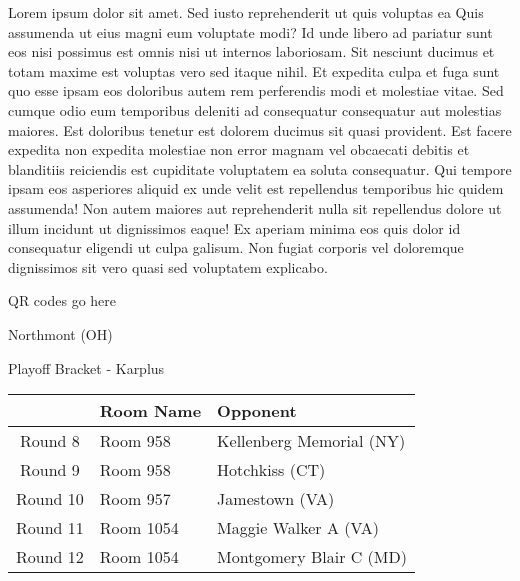\documentclass{article}%
\begin{document}
\vspace*{8pt}%
\linebreak%
\newline%
\newline%
Lorem ipsum dolor sit amet. Sed iusto reprehenderit ut quis voluptas ea Quis assumenda ut eius magni eum voluptate modi? Id unde libero ad pariatur sunt eos nisi possimus est omnis nisi ut internos laboriosam. Sit nesciunt ducimus et totam maxime est voluptas vero sed itaque nihil. Et expedita culpa et fuga sunt quo esse ipsam eos doloribus autem rem perferendis modi et molestiae vitae.\newline%
\newline%
Sed cumque odio eum temporibus deleniti ad consequatur consequatur aut molestias maiores. Est doloribus tenetur est dolorem ducimus sit quasi provident. Est facere expedita non expedita molestiae non error magnam vel obcaecati debitis et blanditiis reiciendis est cupiditate voluptatem ea soluta consequatur. Qui tempore ipsam eos asperiores aliquid ex unde velit est repellendus temporibus hic quidem assumenda!\newline%
\newline%
Non autem maiores aut reprehenderit nulla sit repellendus dolore ut illum incidunt ut dignissimos eaque! Ex aperiam minima eos quis dolor id consequatur eligendi ut culpa galisum. Non fugiat corporis vel doloremque dignissimos sit vero quasi sed voluptatem explicabo.\newline%
\newline%
%
\vspace*{30pt}%
\begin{center}%
\begin{Huge}%
QR codes go here%
\end{Huge}%
\end{center}%
\newpage%
\begin{center}%
\begin{Huge}%
Northmont (OH)%
\end{Huge}%
\vspace*{8pt}%
\linebreak%
\begin{Large}%
Playoff Bracket {-} Karplus%
\end{Large}%
\end{center}%
%
\begin{tabularx}{\textwidth}{|c|Y|Y|}%
\hline%
&Room Name&Opponent\\%
\hline%
Round 8&Room 958&Kellenberg Memorial (NY)\\%
Round 9&Room 958&Hotchkiss (CT)\\%
Round 10&Room 957&Jamestown (VA)\\%
Round 11&Room 1054&Maggie Walker A (VA)\\%
Round 12&Room 1054&Montgomery Blair C (MD)\\%
\hline%
\end{tabularx}%
\end{document}
